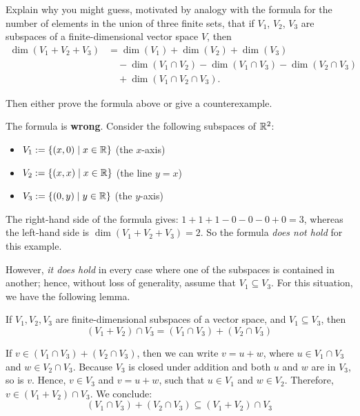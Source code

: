 \begin{xrcs}
  Explain why you might guess, motivated by analogy with the formula for the number of elements in the union of three finite sets, that if $V_1$, $V_2$, $V_3$ are subspaces of a finite-dimensional vector space $V$, then
  \begin{equation}
      \begin{aligned}
      \dim (V_1 + V_2 + V_3) &= \dim (V_1) + \dim (V_2) + \dim (V_3) \\
      & \quad - \dim(V_1 \cap V_2) - \dim (V_1 \cap V_3) - \dim (V_2 \cap V_3) \\
      & \quad + \dim (V_1 \cap V_2 \cap V_3).
    \end{aligned}
  \end{equation}


  Then either prove the formula above or give a counterexample.

  \begin{xsol}
    The formula is \textbf{wrong}. Consider the following subspaces of $\mathbb{R}^2$:
    \begin{itemize}
      \item $V_1 := \{ (x,0) \mid x \in \mathbb{R} \} $ \quad (the $x$-axis)
      \item $V_2 := \{ (x,x) \mid x \in \mathbb{R} \} $ \quad (the line $y=x$)
      \item $V_3 := \{ (0,y) \mid y \in \mathbb{R} \} $ \quad (the $y$-axis)
    \end{itemize}

    The right-hand side of the formula gives: $1+1+1-0-0-0+0 = 3$, whereas the left-hand side is $\dim (V_1 + V_2 + V_3) = 2$. So the formula \emph{does not hold} for this example.

    However, \emph{it does hold}  in every case where one of the subspaces is contained in another; hence, without loss of generality, assume that $V_1 \subseteq V_3$. For this situation, we have the following lemma.

     If $V_1, V_2, V_3$ are finite-dimensional subspaces of a vector space, and $V_1 \subseteq V_3$, then
    \begin{equation}
      \label{eq: lemma}
       (V_1 + V_2) \cap V_3 = (V_1 \cap V_3) + (V_2 \cap V_3)
    \end{equation}

    \begin{xprf}
      If $v \in (V_1 \cap V_3) + (V_2 \cap V_3)$, then we can write $v = u + w$, where $u \in V_1\cap V_3$ and  $w \in V_2 \cap V_3$.
      Because $V_3$ is closed under addition and both $u$ and $w$ are in $V_3$, so is $v$. Hence, $v \in V_3$ and $v=u+w$, such that $u \in V_1$ and $w \in V_2$. Therefore, $v \in (V_1 + V_2) \cap V_3$. We conclude:
      \begin{equation}
        \label{eq: first inclusion}
        (V_1 \cap V_3) + (V_2 \cap V_3) \subseteq (V_1 + V_2) \cap V_3
      \end{equation}


\end{xprf}
\end{xsol}
\end{xrcs}
